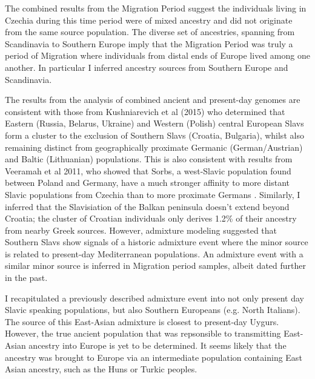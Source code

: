 The combined results from the Migration Period suggest the individuals living in Czechia during this time period were of mixed ancestry and did not originate from the same source population. The diverse set of ancestries, spanning from Scandinavia to Southern Europe imply that the Migration Period was truly a period of Migration where individuals from distal ends of Europe lived among one another. In particular I inferred ancestry sources from Southern Europe and Scandinavia. 

The results from the analysis of combined ancient and present-day genomes are consistent with those from Kushniarevich et al (2015) \cite{Kushniarevich23015} who determined that Eastern (Russia, Belarus, Ukraine) and Western (Polish) central European Slavs form a cluster to the exclusion of Southern Slavs (Croatia, Bulgaria), whilst also remaining distinct from geographically proximate Germanic (German/Austrian) and Baltic (Lithuanian) populations. This is also consistent with results from Veeramah et al 2011, who showed that Sorbs, a west-Slavic population found between Poland and Germany, have a much stronger affinity to more distant Slavic populations from Czechia than to more proximate Germans \cite{veeramah2011genetic}. Similarly, I inferred that the Slavisiation of the Balkan peninsula doesn't extend beyond Croatia; the cluster of Croatian individuals only derives 1.2\% of their ancestry from nearby Greek sources. However, admixture modeling suggested that Southern Slavs show signals of a historic admixture event where the minor source is related to present-day Mediterranean populations. An admixture event with a similar minor source is inferred in Migration period samples, albeit dated further in the past. 

I recapitulated a previously described admixture event into not only present day Slavic speaking populations, but also Southern Europeans (e.g. North Italians). The source of this East-Asian admixture is closest to present-day Uygurs. However, the true ancient population that was repsonsible to transmitting East-Asian ancestry into Europe is yet to be determined. It seems likely that the ancestry was brought to Europe via an intermediate population containing East Asian ancestry, such as the Huns or Turkic peoples. 

